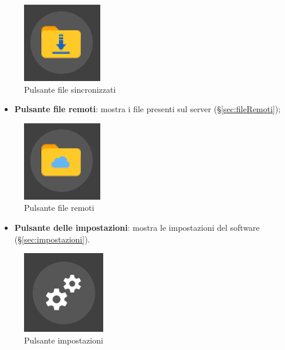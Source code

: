 \begin{figure}[H]
    \centering
    \includegraphics[scale = 1]{components/img/pulsanteFileS.png}
    \caption{Pulsante file sincronizzati}
    \label{fig:PfileSync}
\end{figure}
\begin{itemize}
\item \textbf{Pulsante file remoti}: mostra i file presenti sul server (\S{}\ref{sec:fileRemoti}); \
\end{itemize}
\begin{figure}[H]
    \centering
    \includegraphics[scale = 1]{components/img/pulsanteFileR.png}
    \caption{Pulsante file remoti}
    \label{fig:PfileRem}
\end{figure}
\begin{itemize}
\item \textbf{Pulsante delle impostazioni}: mostra le impostazioni del software (\S{}\ref{sec:impostazioni}). \
\end{itemize}
\begin{figure}[H]
    \centering
    \includegraphics[scale = 1]{components/img/pulsanteImpostazioni.png}
    \caption{Pulsante impostazioni}
    \label{fig:PImp}
\end{figure}


